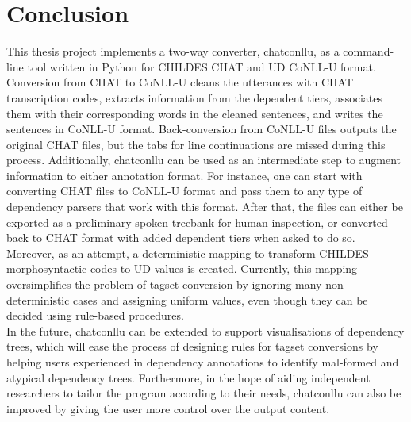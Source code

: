 \chapter{Conclusion} %

\label{Chapter6} %

This thesis project implements a two-way converter, chatconllu, as a command-line tool written in Python for CHILDES CHAT and UD CoNLL-U format. Conversion from CHAT to CoNLL-U cleans the utterances with CHAT transcription codes, extracts information from the dependent tiers, associates them with their corresponding words in the cleaned sentences, and writes the sentences in CoNLL-U format. Back-conversion from CoNLL-U files outputs the original CHAT files, but the tabs for line continuations are missed during this process. Additionally, chatconllu can be used as an intermediate step to augment information to either annotation format. For instance, one can start with converting CHAT files to CoNLL-U format and pass them to any type of dependency parsers that work with this format. After that, the files can either be exported as a preliminary spoken treebank for human inspection, or converted back to CHAT format with added dependent tiers when asked to do so.\\

Moreover, as an attempt, a deterministic mapping to transform CHILDES morphosyntactic codes to UD values is created. Currently, this mapping oversimplifies the problem of tagset conversion by ignoring many non-deterministic cases and assigning uniform values, even though they can be decided using rule-based procedures.\\

In the future, chatconllu can be extended to support visualisations of dependency trees, which will ease the process of designing rules for tagset conversions by helping users experienced in dependency annotations to identify mal-formed and atypical dependency trees. Furthermore, in the hope of aiding independent researchers to tailor the program according to their needs, chatconllu can also be improved by giving the user more control over the output content.
